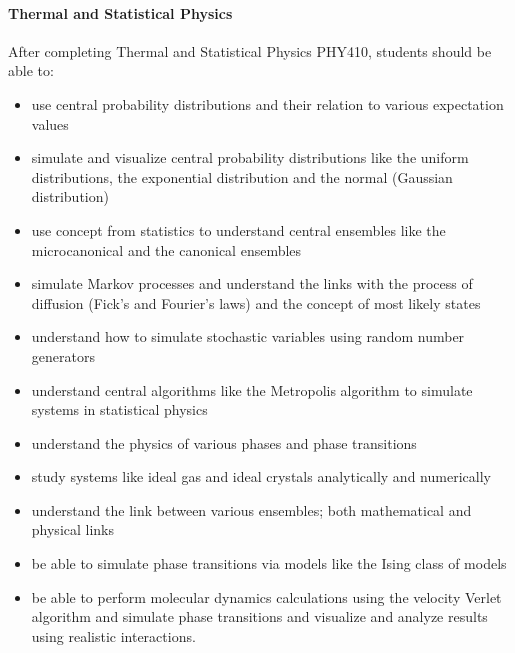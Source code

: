 \noindent
\paragraph{Thermal and Statistical Physics}
After completing Thermal and Statistical Physics PHY410, students should be able to:
\begin{itemize}
\item use central probability distributions and their relation to various expectation values

\item simulate and visualize central probability distributions like the uniform distributions, the exponential distribution and the normal (Gaussian distribution)

\item use concept from statistics to understand central ensembles like the microcanonical and the canonical ensembles

\item simulate Markov processes and understand the links with the process of diffusion (Fick's and Fourier's laws) and the concept of most likely states

\item understand how to simulate stochastic variables using random number generators

\item understand central algorithms like the Metropolis algorithm to simulate systems in statistical physics

\item understand the physics of various phases and phase transitions

\item study systems like ideal gas and ideal crystals analytically and numerically

\item understand the link between various ensembles; both mathematical and physical links

\item be able to simulate phase transitions via models like the Ising class of models

\item be able to perform molecular dynamics calculations using the velocity Verlet algorithm and simulate phase transitions and visualize and analyze results using realistic interactions.
\end{itemize}

\noindent
